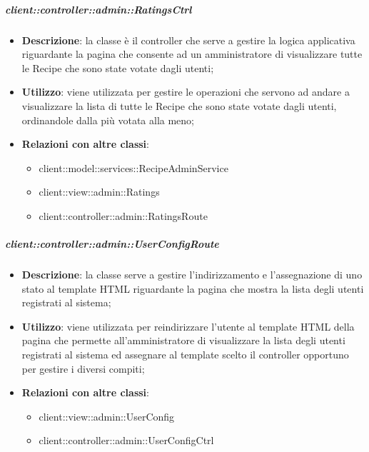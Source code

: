 		\subparagraph{client::controller::admin::RatingsCtrl} %
		\label{subp:bdsm_app_client_controller_admin_ratingsctrl}
			\begin{itemize}
				\item \textbf{Descrizione}: la classe è il controller che serve a gestire la logica applicativa riguardante la pagina che consente ad un amministratore di visualizzare tutte le Recipe che sono state votate dagli utenti;
				\item \textbf{Utilizzo}: viene utilizzata per gestire le operazioni che servono ad andare a visualizzare la lista di tutte le Recipe che sono state votate dagli utenti, ordinandole dalla più votata alla meno;
				\item \textbf{Relazioni con altre classi}:
					\begin{itemize}
						\item client::model::services::RecipeAdminService
						\item client::view::admin::Ratings
						\item client::controller::admin::RatingsRoute
					\end{itemize}
			\end{itemize}

		\subparagraph{client::controller::admin::UserConfigRoute} %
		\label{subp:bdsm_app_client_controller_admin_userconfigroute}
			\begin{itemize}
				\item \textbf{Descrizione}: la classe serve a gestire l'indirizzamento e l'assegnazione di uno stato al template HTML riguardante la pagina che mostra la lista degli utenti registrati al sistema;
				\item \textbf{Utilizzo}: viene utilizzata per reindirizzare l'utente al template HTML della pagina che permette all'amministratore di visualizzare la lista degli utenti registrati al sistema ed assegnare al template scelto il controller opportuno per gestire i diversi compiti;
				\item \textbf{Relazioni con altre classi}:
					\begin{itemize}
						\item client::view::admin::UserConfig
						\item client::controller::admin::UserConfigCtrl
					\end{itemize}
			\end{itemize}

